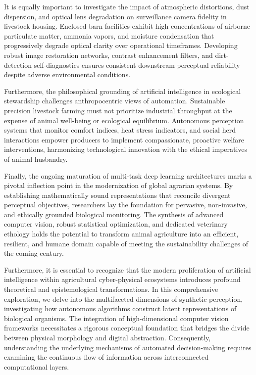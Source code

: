 \documentclass[Times,12pt,oneside,openany,print,index]{report}
\begin{document}
It is equally important to investigate the impact of atmospheric distortions, dust dispersion, and optical lens degradation on surveillance camera fidelity in livestock housing. Enclosed barn facilities exhibit high concentrations of airborne particulate matter, ammonia vapors, and moisture condensation that progressively degrade optical clarity over operational timeframes. Developing robust image restoration networks, contrast enhancement filters, and dirt-detection self-diagnostics ensures consistent downstream perceptual reliability despite adverse environmental conditions.

Furthermore, the philosophical grounding of artificial intelligence in ecological stewardship challenges anthropocentric views of automation. Sustainable precision livestock farming must not prioritize industrial throughput at the expense of animal well-being or ecological equilibrium. Autonomous perception systems that monitor comfort indices, heat stress indicators, and social herd interactions empower producers to implement compassionate, proactive welfare interventions, harmonizing technological innovation with the ethical imperatives of animal husbandry.

Finally, the ongoing maturation of multi-task deep learning architectures marks a pivotal inflection point in the modernization of global agrarian systems. By establishing mathematically sound representations that reconcile divergent perceptual objectives, researchers lay the foundation for pervasive, non-invasive, and ethically grounded biological monitoring. The synthesis of advanced computer vision, robust statistical optimization, and dedicated veterinary ethology holds the potential to transform animal agriculture into an efficient, resilient, and humane domain capable of meeting the sustainability challenges of the coming century.

Furthermore, it is essential to recognize that the modern proliferation of artificial intelligence within agricultural cyber-physical ecosystems introduces profound theoretical and epistemological transformations. In this comprehensive exploration, we delve into the multifaceted dimensions of synthetic perception, investigating how autonomous algorithms construct latent representations of biological organisms. The integration of high-dimensional computer vision frameworks necessitates a rigorous conceptual foundation that bridges the divide between physical morphology and digital abstraction. Consequently, understanding the underlying mechanisms of automated decision-making requires examining the continuous flow of information across interconnected computational layers.
\end{document}
